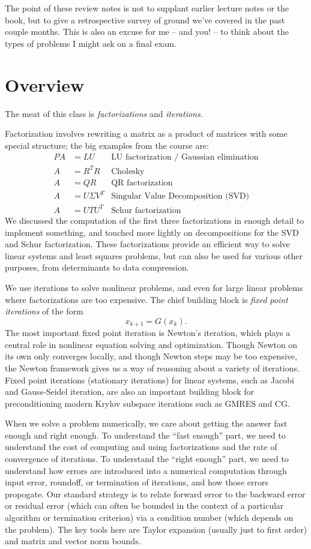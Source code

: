 \documentclass[12pt, leqno]{article}
\begin{document}
The point of these review notes is not to supplant earlier lecture
notes or the book, but to give a retrospective survey of ground
we've covered in the past couple months.  This is also an excuse
for me -- and you! -- to think about the types of problems I might
ask on a final exam.

\section{Overview}

The meat of this class is {\em factorizations} and {\em iterations}.

Factorization involves rewriting a matrix as a product of matrices
with some special structure; the big examples from the course are:
\begin{align*}
  PA &= LU          & \mbox{LU factorization / Gaussian elimination} \\
  A &= R^T R        & \mbox{Cholesky} \\
  A &= QR           & \mbox{QR factorization} \\
  A &= U \Sigma V^T & \mbox{Singular Value Decomposition (SVD)} \\
  A &= U T U^T      & \mbox{Schur factorization}
\end{align*}
We discussed the computation of the first three factorizations
in enough detail to implement something, and touched more lightly
on decompositions for the SVD and Schur factorization.  These
factorizations provide an efficient way to solve linear systems
and least squares problems, but can also be used for various
other purposes, from determinants to data compression.

We use iterations to solve nonlinear problems, and even for large
linear problems where factorizations are too expensive.  The chief
building block is {\em fixed point iterations} of the form
\[
  x_{k+1} = G(x_k).
\]
The most important fixed point iteration is Newton's iteration,
which plays a central role in nonlinear equation solving and
optimization.  Though Newton on its own only converges locally, and
though Newton steps may be too expensive, the Newton framework gives
us a way of reasoning about a variety of iterations.  Fixed point
iterations (stationary iterations) for linear systems, such as Jacobi
and Gauss-Seidel iteration, are also an important building block for
preconditioning modern Krylov subspace iterations such as GMRES and CG.

When we solve a problem numerically, we care about getting the answer
fast enough and right enough.  To understand the ``fast enough'' part,
we need to understand the cost of computing and using factorizations
and the rate of convergence of iterations.  To understand the ``right
enough'' part, we need to understand how errors are introduced into a
numerical computation through input error, roundoff, or termination of
iterations, and how those errors propogate.  Our standard strategy is
to relate forward error to the backward error or residual error (which
can often be bounded in the context of a particular algorithm or
termination criterion) via a condition number (which depends on the
problem).  The key tools here are Taylor expansion (usually just to
first order) and matrix and vector norm bounds.
\end{document}
